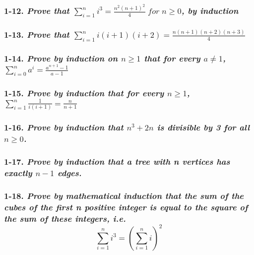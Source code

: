 {\color{pendsol}{} 

\subsubsection*{\textbf{1-12.} \emph{Prove that $\sum_{i=1}^{n}i^{3}=\frac{n^{2}(n+1)^{2}}{4} \;for\; n \geq 0$, by induction}}

\subsubsection*{\textbf{1-13.} \emph{Prove that $\sum_{i=1}^{n}i(i+1)(i+2)=\frac{n(n+1)(n+2)(n+3)}{4}$ }}

\subsubsection*{\textbf{1-14.} \emph{Prove by induction on $n\geq1$ that for every $a\neq1$,  $\sum_{i=0}^{n}a^{i} = \frac{a^{n+1} - 1}{a - 1}$}}

\subsubsection*{\textbf{1-15.} \emph{Prove by induction that for every $n\geq1$,  $\sum_{i=1}^{n}\frac{1}{i(i+1)} = \frac{n}{n+1}$}}

\subsubsection*{\textbf{1-16.} \emph{Prove by induction that $n^{3}+2n$ is divisible by 3 for all $n\geq0$.}}

\subsubsection*{\textbf{1-17.} \emph{Prove by induction that a tree with n vertices has exactly $n-1$ edges.}}

\subsubsection*{\textbf{1-18.} \emph{Prove by mathematical induction that the sum of the cubes of the first n positive integer is equal to the square of the sum of these integers, i.e.
$$\sum_{i=1}^{n}i^{3} = (\sum_{i=1}^{n}i)^{2}$$}}


}

